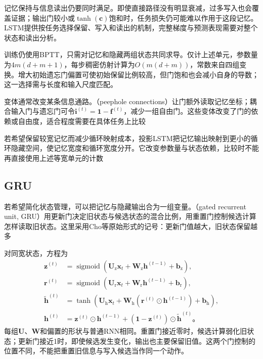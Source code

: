 记忆保持与信息读出仍要同时满足。即使直接路径没有明显衰减，过多写入也会覆盖证据；输出门较小或$\tanh(\bm c)$饱和时，任务损失仍可能难以作用于这段记忆。LSTM提供按任务选择保留、写入和读出的机制，完整梯度与预测表现需要对整个状态和读出分析。

训练仍使用BPTT，只需对记忆和隐藏两组状态共同求导。仅计上述单元，参数量为$4m(d+m+1)$，每步稠密仿射计算为$O(m(d+m))$，常数来自四组变换。增大初始遗忘门偏置可使初始保留比例较高，但门饱和也会减小自身的导数；这一选择需与长度和输入尺度匹配。

变体通常改变某条信息通路。（peephole connections）让门额外读取记忆坐标；耦合输入门与遗忘门可令$\bm{i}^{(t)}=\bm{1}-\bm{f}^{(t)}$，减少一组自由门。这些变体改变了门的依赖或自由度，适合程度需要在具体任务上比较

若希望保留较宽记忆而减少循环映射成本，投影LSTM把记忆输出映射到更小的循环隐藏空间，使记忆宽度和循环宽度分开。它改变参数量与状态依赖，比较时不能再直接使用上述等宽单元的计数

\subsection{GRU}
\label{sec:rnn-gru}

若希望简化状态管理，可以把记忆与隐藏输出合为一组变量。（gated recurrent unit, GRU）用更新门决定旧状态与候选状态的混合比例，用重置门控制候选计算怎样读取旧状态。这里采用Cho等原始形式的记号：更新门值越大，旧状态保留越多

对同宽状态，方程为
\begin{equation}
  \begin{aligned}
    \bm{z}^{(t)}&=\operatorname{sigmoid}\!\left(
      \bm{U}_{\mathrm{z}}\bm{x}_t+\bm{W}_{\mathrm{z}}\bm{h}^{(t-1)}
      +\bm{b}_{\mathrm{z}}\right),\\
    \bm{r}^{(t)}&=\operatorname{sigmoid}\!\left(
      \bm{U}_{\mathrm{r}}\bm{x}_t+\bm{W}_{\mathrm{r}}\bm{h}^{(t-1)}
      +\bm{b}_{\mathrm{r}}\right),\\
    \widetilde{\bm{h}}^{(t)}&=\tanh\!\left(
      \bm{U}_{\mathrm{h}}\bm{x}_t
      +\bm{W}_{\mathrm{h}}(\bm{r}^{(t)}\odot\bm{h}^{(t-1)})
      +\bm{b}_{\mathrm{h}}\right),\\
    \bm{h}^{(t)}&=\bm{z}^{(t)}\odot\bm{h}^{(t-1)}
      +(\bm{1}-\bm{z}^{(t)})\odot\widetilde{\bm{h}}^{(t)}\text{。}
  \end{aligned}
  \label{eq:rnn-gru-update}
\end{equation}
每组$\bm{U}$、$\bm{W}$和偏置的形状与普通RNN相同。重置门接近零时，候选计算弱化旧状态；更新门接近1时，即使候选发生变化，输出也主要保留旧值。这两个门控制的位置不同，不能把重置旧信息与写入候选当作同一个动作。

